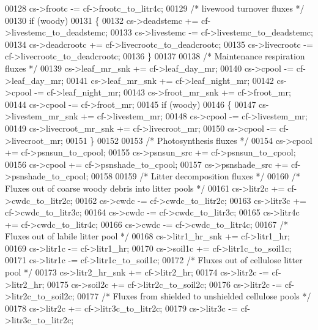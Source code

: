 \begin{DoxyCode}
{00128     cs->frootc     -= cf->frootc\_to\_litr4c;
00129     \textcolor{comment}{/* livewood turnover fluxes */}
00130     \textcolor{keywordflow}{if} (woody)
00131     \{
00132         cs->deadstemc  += cf->livestemc\_to\_deadstemc;
00133         cs->livestemc  -= cf->livestemc\_to\_deadstemc;
00134         cs->deadcrootc += cf->livecrootc\_to\_deadcrootc;
00135         cs->livecrootc -= cf->livecrootc\_to\_deadcrootc;
00136     \}
00137     
00138     \textcolor{comment}{/* Maintenance respiration fluxes */}
00139     cs->leaf\_mr\_snk  += cf->leaf\_day\_mr;
00140     cs->cpool        -= cf->leaf\_day\_mr;
00141     cs->leaf\_mr\_snk  += cf->leaf\_night\_mr;
00142     cs->cpool        -= cf->leaf\_night\_mr;
00143     cs->froot\_mr\_snk += cf->froot\_mr;
00144     cs->cpool        -= cf->froot\_mr;
00145     \textcolor{keywordflow}{if} (woody)
00146     \{
00147         cs->livestem\_mr\_snk  += cf->livestem\_mr;
00148         cs->cpool            -= cf->livestem\_mr;
00149         cs->livecroot\_mr\_snk += cf->livecroot\_mr;
00150         cs->cpool            -= cf->livecroot\_mr;
00151     \}
00152     
00153     \textcolor{comment}{/* Photosynthesis fluxes */}
00154     cs->cpool        += cf->psnsun\_to\_cpool;
00155     cs->psnsun\_src   += cf->psnsun\_to\_cpool;
00156     cs->cpool        += cf->psnshade\_to\_cpool;
00157     cs->psnshade\_src += cf->psnshade\_to\_cpool;
00158     
00159     \textcolor{comment}{/* Litter decomposition fluxes */}
00160     \textcolor{comment}{/* Fluxes out of coarse woody debris into litter pools */}
00161     cs->litr2c       += cf->cwdc\_to\_litr2c;
00162     cs->cwdc         -= cf->cwdc\_to\_litr2c;
00163     cs->litr3c       += cf->cwdc\_to\_litr3c;
00164     cs->cwdc         -= cf->cwdc\_to\_litr3c;
00165     cs->litr4c       += cf->cwdc\_to\_litr4c;
00166     cs->cwdc         -= cf->cwdc\_to\_litr4c;
00167     \textcolor{comment}{/* Fluxes out of labile litter pool */}
00168     cs->litr1\_hr\_snk += cf->litr1\_hr;
00169     cs->litr1c       -= cf->litr1\_hr;
00170     cs->soil1c       += cf->litr1c\_to\_soil1c;
00171     cs->litr1c       -= cf->litr1c\_to\_soil1c;
00172     \textcolor{comment}{/* Fluxes out of cellulose litter pool */}
00173     cs->litr2\_hr\_snk += cf->litr2\_hr;
00174     cs->litr2c       -= cf->litr2\_hr;
00175     cs->soil2c       += cf->litr2c\_to\_soil2c;
00176     cs->litr2c       -= cf->litr2c\_to\_soil2c;
00177     \textcolor{comment}{/* Fluxes from shielded to unshielded cellulose pools */}
00178     cs->litr2c       += cf->litr3c\_to\_litr2c;
00179     cs->litr3c       -= cf->litr3c\_to\_litr2c;
}
\end{DoxyCode}
